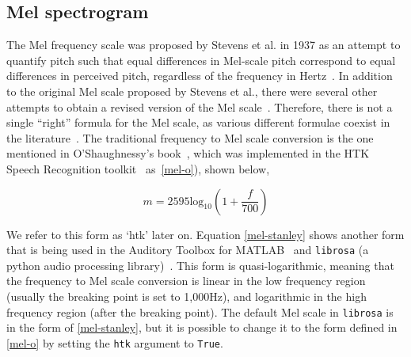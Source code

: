 \documentclass{ieeeaccess}
\newcommand{\nbh}[1]{\texttt{#1}}
\begin{document}
\subsection{Mel spectrogram}
The Mel frequency scale was proposed by Stevens et al. in 1937 as an attempt to quantify pitch such that equal differences in Mel-scale pitch correspond to equal differences in perceived pitch, regardless of the frequency in Hertz~\cite{Stevens1937ASF}. 
In addition to the original Mel scale proposed by Stevens et al., there were several other attempts to obtain a revised version of the Mel scale~\cite{Stevens1940TheRO, fant1949analys, koening1949new}. Therefore, there is not a single ``right'' formula for the Mel scale, as various different formulae coexist in the literature~\cite{umesh1999fitting}.  The traditional frequency to Mel scale conversion is the one mentioned in O'Shaughnessy's book~\cite{o1987speech}, which was implemented in the HTK Speech Recognition toolkit~\cite{young2002htk} as~\eqref{mel-o}), shown below,

\begin{equation}
m=2595 \text{log}_{10}\left(1+\frac{f}{700} \right)
\label{mel-o}
\end{equation}

We refer to this form as `htk' later on. Equation \eqref{mel-stanley} shows another form that is being used in the Auditory Toolbox for MATLAB~\cite{slaney1998matlab} and \nbh{librosa} (a python audio processing library)~\cite{mcfee2015Librosa}. This form is quasi-logarithmic, meaning that the frequency to Mel scale conversion is linear in the low frequency region (usually the breaking point is set to 1,000Hz), and logarithmic in the high frequency region (after the breaking point). The default Mel scale in \nbh{librosa} is in the form of \eqref{mel-stanley}, but it is possible to change it to the form defined in \eqref{mel-o} by setting the \nbh{htk} argument to \nbh{True}.
\end{document}

